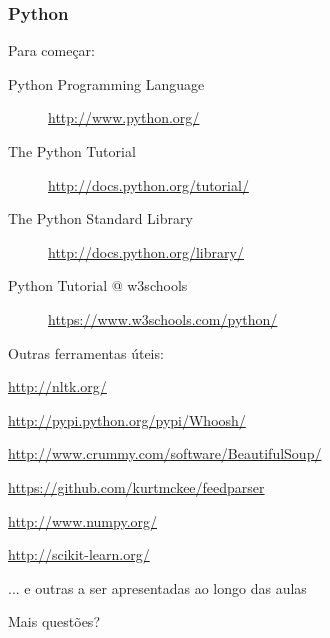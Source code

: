 \documentclass{beamer}
\begin{document}
\begin{frame}
    \frametitle{Python}    
    \begin{block}{Para começar:}
        \footnotesize
        \begin{description}
        \item[Python Programming Language] \url{http://www.python.org/}
        \item[The Python Tutorial] \url{http://docs.python.org/tutorial/}
        \item[The Python Standard Library] \url{http://docs.python.org/library/}
        \item[Python Tutorial @ w3schools] \url{https://www.w3schools.com/python/}
        \end{description}
    \end{block}
    \begin{block}{Outras ferramentas úteis:}
        \footnotesize
        \begin{description}
        \item[Natural Language Toolkit] \url{http://nltk.org/}
        \item[Whoosh] \url{http://pypi.python.org/pypi/Whoosh/}
        \item[Beautiful Soup] \url{http://www.crummy.com/software/BeautifulSoup/}
        \item[feedparser] \url{https://github.com/kurtmckee/feedparser}
        \item[NumPy] \url{http://www.numpy.org/}
        \item[scikit-learn] \url{http://scikit-learn.org/}
        \item ... e outras a ser apresentadas ao longo das aulas
        \end{description}
    \end{block}
\end{frame}

\begin{frame}
    \begin{block}{}
        \centering
        \Large
        Mais questões?
    \end{block}
\end{frame}
\end{document}
